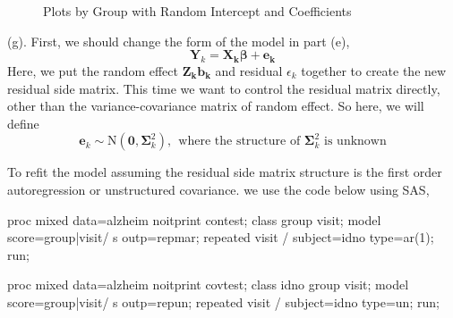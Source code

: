 \documentclass[letterpaper, 12pt]{article}
\begin{document}
\begin{figure}[htbp]
	\caption{Plots by Group with Random Intercept and Coefficients}
	\label{plot3}
	\centering
\end{figure}


(g). First, we should change the form of the model in part (e), 
$$
\bm{Y}_k=\bm{X_k\beta+e_k}
$$
Here, we put the random effect $\bm{Z_kb_k}$ and residual $\epsilon_k$ together to create the new residual side matrix. This time we want to control the residual matrix directly, other than the variance-covariance matrix of random effect. So here, we will define
$$
\bm{e}_k\sim\text{N}(\bm{0},\bm{\Sigma}_k^2),\ \ \text{where the structure of }\bm{\Sigma}_k^2\text{ is unknown}
$$

To refit the model assuming the residual side matrix structure is the first order autoregression or unstructured covariance. we use the code below using SAS,
\begin{Sascode}
proc mixed data=alzheim noitprint contest;
class group visit;
model score=group|visit/ s outp=repmar;
repeated visit / subject=idno type=ar(1);
run;

proc mixed data=alzheim noitprint covtest;
class idno group visit;
model score=group|visit/ s outp=repun;
repeated visit / subject=idno type=un;
run;
\end{Sascode}
\end{document}
